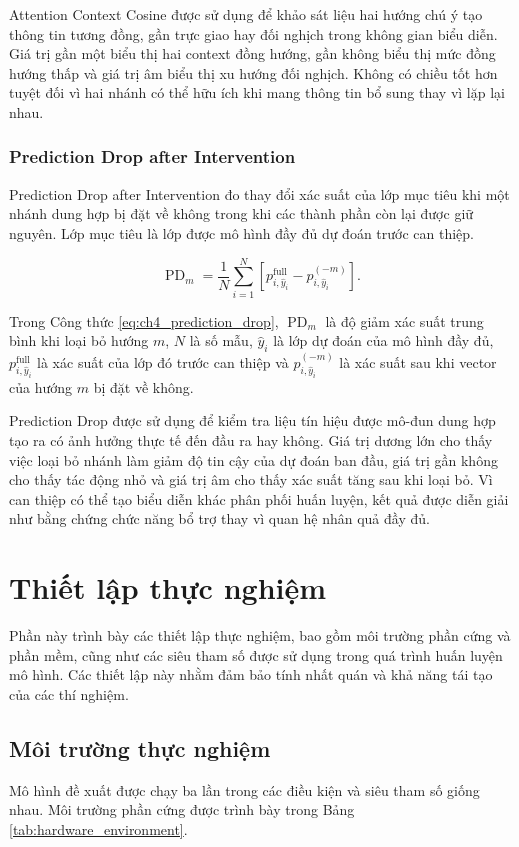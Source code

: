 Attention Context Cosine được sử dụng để khảo sát liệu hai hướng chú ý tạo thông tin tương đồng, gần trực giao hay đối nghịch trong không gian biểu diễn. Giá trị gần một biểu thị hai context đồng hướng, gần không biểu thị mức đồng hướng thấp và giá trị âm biểu thị xu hướng đối nghịch. Không có chiều tốt hơn tuyệt đối vì hai nhánh có thể hữu ích khi mang thông tin bổ sung thay vì lặp lại nhau.

\subsubsection{Prediction Drop after Intervention}

Prediction Drop after Intervention đo thay đổi xác suất của lớp mục tiêu khi một nhánh dung hợp bị đặt về không trong khi các thành phần còn lại được giữ nguyên. Lớp mục tiêu là lớp được mô hình đầy đủ dự đoán trước can thiệp.

\begin{equation}\operatorname{PD}_{m}=\frac{1}{N}\sum_{i=1}^{N}\left[p_{i,\widehat{y}_i}^{\mathrm{full}}-p_{i,\widehat{y}_i}^{(-m)}\right].\label{eq:ch4_prediction_drop}\end{equation}

Trong Công thức \ref{eq:ch4_prediction_drop}, $\operatorname{PD}_{m}$ là độ giảm xác suất trung bình khi loại bỏ hướng $m$, $N$ là số mẫu, $\widehat{y}_i$ là lớp dự đoán của mô hình đầy đủ, $p_{i,\widehat{y}_i}^{\mathrm{full}}$ là xác suất của lớp đó trước can thiệp và $p_{i,\widehat{y}_i}^{(-m)}$ là xác suất sau khi vector của hướng $m$ bị đặt về không.

Prediction Drop được sử dụng để kiểm tra liệu tín hiệu được mô-đun dung hợp tạo ra có ảnh hưởng thực tế đến đầu ra hay không. Giá trị dương lớn cho thấy việc loại bỏ nhánh làm giảm độ tin cậy của dự đoán ban đầu, giá trị gần không cho thấy tác động nhỏ và giá trị âm cho thấy xác suất tăng sau khi loại bỏ. Vì can thiệp có thể tạo biểu diễn khác phân phối huấn luyện, kết quả được diễn giải như bằng chứng chức năng bổ trợ thay vì quan hệ nhân quả đầy đủ.

\section{Thiết lập thực nghiệm}
Phần này trình bày các thiết lập thực nghiệm, bao gồm môi trường phần cứng và phần mềm, cũng như các siêu tham số được sử dụng trong quá trình huấn luyện mô hình. Các thiết lập này nhằm đảm bảo tính nhất quán và khả năng tái tạo của các thí nghiệm.
\subsection{Môi trường thực nghiệm}
Mô hình đề xuất được chạy ba lần trong các điều kiện và siêu tham số giống nhau. Môi trường phần cứng được trình bày trong Bảng
\ref{tab:hardware_environment}.

